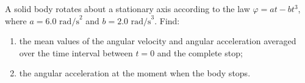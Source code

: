 
\item A solid body rotates about a stationary axis according to the law $\varphi = at - bt^3$, where $a = 6.0 \text{ rad/s}^2$ and $b = 2.0 \text{ rad/s}^3$. Find:
    \begin{center}
    \end{center}
    \begin{enumerate}
        \item the mean values of the angular velocity and angular acceleration averaged over the time interval between $t = 0$ and the complete stop;
        \item the angular acceleration at the moment when the body stops.
    \end{enumerate}
